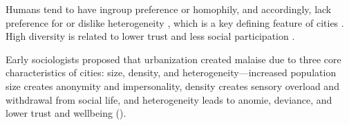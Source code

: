 \documentclass[11pt, letterpaper]{article}
\begin{document}
\begin{spacing}{1.4}


Humans tend to have ingroup preference or homophily, and
accordingly, lack preference for or dislike heterogeneity
\citep{smith14,mcpherson01,bleidorn16,putnam07}, which is a key defining feature
of cities \citep{wirth38,amin06,thrift05}. High diversity is related to lower trust and less social participation \citep{alesina99,alesina00,luttmer01,alesina02,rodriguez2019does}. %


Early sociologists  
 proposed that urbanization created malaise due to three core characteristics of cities: size, density, and heterogeneity---increased population size creates anonymity and
 impersonality, density creates sensory overload and withdrawal from social
 life, and heterogeneity leads to anomie, deviance, and lower trust and wellbeing (\citet{park84,
   simmel03, tonnies57, wirth38,putnam07,aok_brfss_segregation15,herbst14,postmes02,vogt07,smelser99}).
%






\end{spacing}
\end{document}
